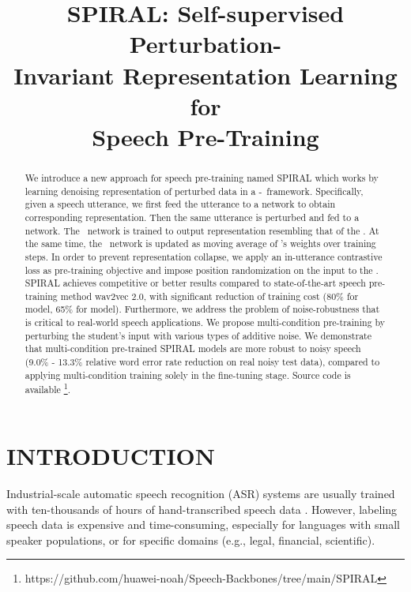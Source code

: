 \title{SPIRAL: Self-supervised Perturbation-\\Invariant Representation Learning for\\ Speech Pre-Training}



\maketitle

\begin{abstract}
We introduce a new approach for speech pre-training named SPIRAL which works by learning denoising representation of perturbed data in a \teacher-\student\ framework.
Specifically, given a speech utterance, we first feed the utterance to a \textit{\teacher} network to obtain corresponding representation. Then the same utterance is perturbed and fed to a \textit{\student} network. The \student\ network is trained to output representation resembling that of the \teacher. At the same time, the \teacher\ network is updated as moving average of \student's weights over training steps. In order to prevent representation collapse, we apply an in-utterance contrastive loss as pre-training objective and impose position randomization on the input to the \teacher. SPIRAL achieves competitive or better results compared to state-of-the-art speech pre-training method wav2vec 2.0, with significant reduction of training cost (80\% for \tscbase{} model, 65\% for \tscbig{} model).
Furthermore, we address the problem of noise-robustness that is critical to real-world speech applications. We propose multi-condition pre-training by perturbing the student's input with various types of additive noise.
We demonstrate that multi-condition pre-trained SPIRAL models are more robust to noisy speech (9.0\% - 13.3\% relative word error rate reduction on real noisy test data), compared to applying multi-condition training solely in the fine-tuning stage.
Source code is available \footnote{https://github.com/huawei-noah/Speech-Backbones/tree/main/SPIRAL}.
\end{abstract}

\section{INTRODUCTION}

Industrial-scale automatic speech recognition (ASR) systems are usually trained with ten-thousands of hours of hand-transcribed speech data \citep{galvez2021the}.
However, labeling speech data is expensive and time-consuming, especially for languages with small speaker populations, or for specific domains (e.g., legal, financial, scientific).

